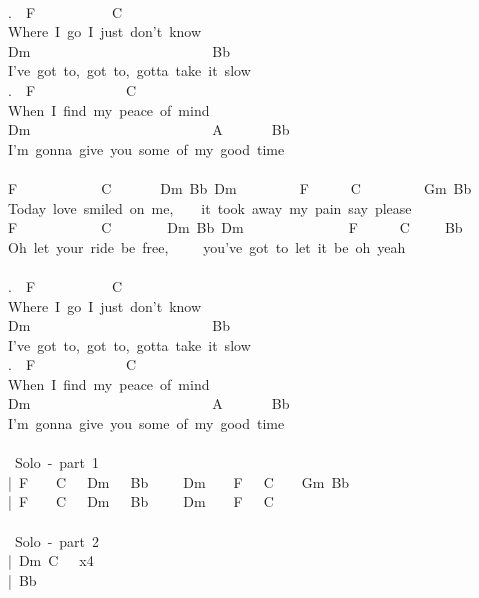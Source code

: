 {\\
.\ \ F\ \ \ \ \ \ \ \ \ \ \ C\\
Where\ I\ go\ I\ just\ don't\ know\ \\
Dm\ \ \ \ \ \ \ \ \ \ \ \ \ \ \ \ \ \ \ \ \ \ \ \ \ \ Bb\\
I've\ got\ to,\ got\ to,\ gotta\ take\ it\ slow\\
.\ \ F\ \ \ \ \ \ \ \ \ \ \ \ \ C\\
When\ I\ find\ my\ peace\ of\ mind\\
Dm\ \ \ \ \ \ \ \ \ \ \ \ \ \ \ \ \ \ \ \ \ \ \ \ \ \ A\ \ \ \ \ \ \ Bb\\
I'm\ gonna\ give\ you\ some\ of\ my\ good\ time\\
\\
F\ \ \ \ \ \ \ \ \ \ \ \ C\ \ \ \ \ \ \ Dm\ Bb\ Dm\ \ \ \ \ \ \ \ \ F\ \ \ \ \ \ C\ \ \ \ \ \ \ \ \ Gm\ Bb\\
Today\ love\ smiled\ on\ me,\ \ \ \ it\ took\ away\ my\ pain\ say\ please\\
F\ \ \ \ \ \ \ \ \ \ \ \ C\ \ \ \ \ \ \ \ Dm\ Bb\ Dm\ \ \ \ \ \ \ \ \ \ \ \ \ \ \ F\ \ \ \ \ \ C\ \ \ \ \ Bb\\
Oh\ let\ your\ ride\ be\ free,\ \ \ \ \ you've\ got\ to\ let\ it\ be\ oh\ yeah\\
\\
.\ \ F\ \ \ \ \ \ \ \ \ \ \ C\\
Where\ I\ go\ I\ just\ don't\ know\ \\
Dm\ \ \ \ \ \ \ \ \ \ \ \ \ \ \ \ \ \ \ \ \ \ \ \ \ \ Bb\\
I've\ got\ to,\ got\ to,\ gotta\ take\ it\ slow\\
.\ \ F\ \ \ \ \ \ \ \ \ \ \ \ \ C\\
When\ I\ find\ my\ peace\ of\ mind\\
Dm\ \ \ \ \ \ \ \ \ \ \ \ \ \ \ \ \ \ \ \ \ \ \ \ \ \ A\ \ \ \ \ \ \ Bb\\
I'm\ gonna\ give\ you\ some\ of\ my\ good\ time\\
\\
\lbrack\ Solo\ -\ part\ 1\rbrack\\
|\ F\ \ \ \ C\ \ \ Dm\ \ \ Bb\ \ \ \ \ Dm\ \ \ \ F\ \ \ C\ \ \ \ Gm\ Bb\ \ \ \\
|\ F\ \ \ \ C\ \ \ Dm\ \ \ Bb\ \ \ \ \ Dm\ \ \ \ F\ \ \ C\\
\\
\lbrack\ Solo\ -\ part\ 2\rbrack\\
|\ Dm\ C\ \ \ x4\ \\
|\ Bb\ \\
}
